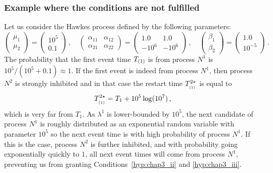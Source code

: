 \subsubsection{Example where the conditions are not fulfilled}
	\begin{example}\label{ex:chap3_2dim_counterexample}
    Let us consider the Hawkes process defined by the following parameters:
		\[
            	     \begin{pmatrix}
                      \mu_{1} \\
                      \mu_{2} 
                      \end{pmatrix} =
                      \begin{pmatrix}
                      10^5 \\ 
                      0.1
                      \end{pmatrix}\,,
                      \quad
                      \begin{pmatrix}
                      \alpha_{11} & \alpha_{12}\\
                      \alpha_{21} & \alpha_{22}
                      \end{pmatrix}=
                      \begin{pmatrix}
                      1.0 & 1.0\\
                      -10^6 & -10^6
                      \end{pmatrix}\,,
                      \quad
                      \begin{pmatrix}
                      \beta_{1} \\
                      \beta_{2} 
                      \end{pmatrix} =
                      \begin{pmatrix}
                      1.0\\ 
                      10^{-5}
                      \end{pmatrix}\,.
    		\]
            The probability that the first event time $T\park[1]$ is from process $N^1$ is $10^5 / (10^5 + 0.1) \approx 1$. If the first event is indeed from process $N^1$, then process $N^2$ is strongly inhibited and in that case the restart time $T_{\park[1]}^{2\star}$ is equal to \[T_{\park[1]}^{2\star} = T_1 + 10^5 \log(10^7)\,,\]
            which is very far from \(T_1\).
            As $\lambda^1$ is lower-bounded by $10^5$, the next candidate of process $N^1$ is roughly distributed as an exponential random variable with parameter $10^5$ so the next event time is with high probability of process $N^1$.
            If this is the case, process $N^2$ is further inhibited,
            and with probability going exponentially quickly to \(1\), all next event times will come from process \(N^1\),
            preventing us from granting Conditions~\ref{hyp:chap3_ii} and \ref{hyp:chap3_iii}.

	\end{example}

